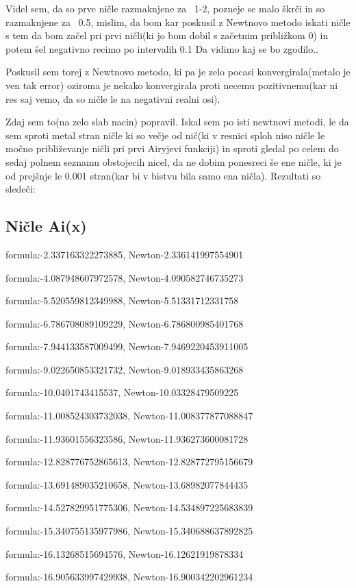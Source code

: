 \documentclass{article}
\begin{document}
Videl sem, da so prve ničle razmaknjene za ~1-2, pozneje se malo škrči in so razmaknjene za ~0.5, mislim, da bom kar poskusil z Newtnovo metodo iskati ničle s tem da bom začel pri prvi ničli(ki jo bom dobil s začetnim približkom 0) in potem šel negativno recimo po intervalih 0.1 Da vidimo kaj se bo zgodilo..

Poskusil sem torej z Newtnovo metodo, ki pa je zelo pocasi konvergirala(metalo je ven tak error) oziroma je nekako konvergirala proti necemu pozitivnemu(kar ni res saj vemo, da so ničle le na negativni realni osi).

Zdaj sem to(na zelo  slab nacin) popravil. Iskal sem po isti newtnovi metodi, le da sem sproti metal stran ničle ki so večje od nič(ki v resnici sploh niso ničle le močno približevanje ničli pri prvi Airyjevi funkciji) in sproti gledal po celem do sedaj polnem seznamu obstojecih nicel, da ne dobim ponesreci še ene ničle, ki je od prejšnje le 0.001 stran(kar bi v bistvu bila samo ena ničla). Rezultati so sledeči:
\newpage
\subsection{Ničle Ai(x)}
formula:-2.337163322273885, Newton-2.336141997554901

formula:-4.087948607972578, Newton-4.090582746735273

formula:-5.520559812349988, Newton-5.51331712331758

formula:-6.786708089109229, Newton-6.786800985401768

formula:-7.944133587009499, Newton-7.9469220453911005

formula:-9.022650853321732, Newton-9.018933435863268

formula:-10.0401743415537, Newton-10.03328479509225

formula:-11.008524303732038, Newton-11.008377877088847

formula:-11.93601556323586, Newton-11.936273600081728

formula:-12.828776752865613, Newton-12.828772795156679

formula:-13.691489035210658, Newton-13.68982077844435

formula:-14.527829951775306, Newton-14.534897225683839

formula:-15.340755135977986, Newton-15.340688637892825

formula:-16.13268515694576, Newton-16.12621919878334

formula:-16.905633997429938, Newton-16.900342202961234
\end{document}
